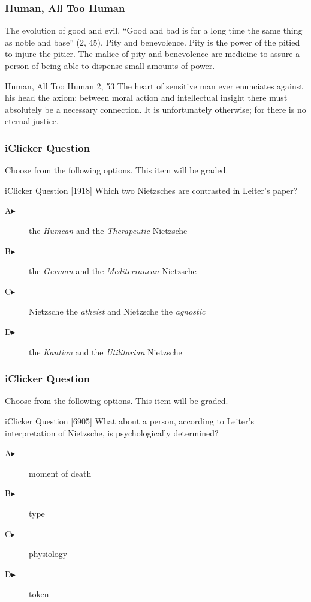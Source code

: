 \documentclass[xcolor=dvipsnames]{beamer}
\begin{document}
\begin{frame}
  \frametitle{Human, All Too Human}
  The evolution of good and evil. ``Good and bad is for a long time
  the same thing as noble and base'' (2, 45). Pity and benevolence.
  Pity is the power of the pitied to injure the pitier. The malice of
  pity and benevolence are medicine to assure a person of being able
  to dispense small amounts of power.
  \begin{block}{Human, All Too Human 2, 53}
    The heart of sensitive man ever enunciates against his head the
    axiom: between moral action and intellectual insight there must
    absolutely be a necessary connection. It is unfortunately
    otherwise; for there is no eternal justice.
  \end{block}
\end{frame}

\begin{frame}
  \frametitle{iClicker Question}
Choose from the following options. This item will be graded.
\begin{block}{iClicker Question}
[1918] Which two Nietzsches are contrasted in Leiter's paper?
\end{block}
\begin{description}
\item[A\hspace{.2in}$\blacktriangleright$] the \emph{Humean} and the \emph{Therapeutic} Nietzsche
\item[B\hspace{.2in}$\blacktriangleright$] the \emph{German} and the \emph{Mediterranean} Nietzsche
\item[C\hspace{.2in}$\blacktriangleright$] Nietzsche the \emph{atheist} and Nietzsche the \emph{agnostic}
\item[D\hspace{.2in}$\blacktriangleright$] the \emph{Kantian} and the \emph{Utilitarian} Nietzsche
\end{description}
\end{frame}

\begin{frame}
  \frametitle{iClicker Question}
Choose from the following options. This item will be graded.
\begin{block}{iClicker Question}
[6905] What about a person, according to Leiter's interpretation of Nietzsche, is psychologically determined?
\end{block}
\begin{description}
\item[A\hspace{.2in}$\blacktriangleright$] moment of death
\item[B\hspace{.2in}$\blacktriangleright$] type
\item[C\hspace{.2in}$\blacktriangleright$] physiology
\item[D\hspace{.2in}$\blacktriangleright$] token
\end{description}
\end{frame}
\end{document}
